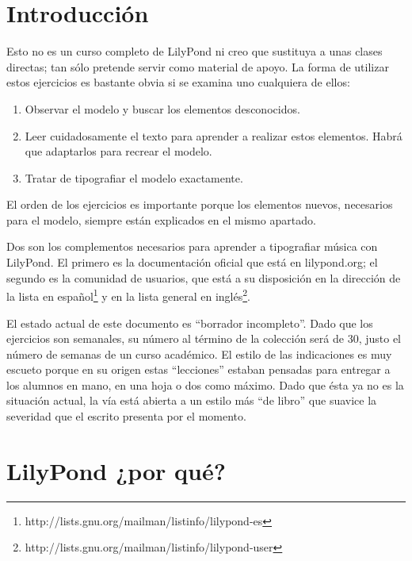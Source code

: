 \section*{Introducción}

Esto no es un curso completo de LilyPond ni creo que sustituya a unas
clases directas; tan sólo pretende servir como material de apoyo. La
forma de utilizar estos ejercicios es bastante obvia si se examina uno
cualquiera de ellos:

\begin{enumerate}
\item Observar el modelo y buscar los elementos desconocidos.

\item Leer cuidadosamente el texto para aprender a realizar estos
  elementos.  Habrá que adaptarlos para recrear el modelo.

\item Tratar de tipografiar el modelo exactamente.

\end{enumerate}

El orden de los ejercicios es importante porque los elementos nuevos,
necesarios para el modelo, siempre están explicados en el mismo
apartado.

Dos son los complementos necesarios para aprender a tipografiar música
con LilyPond.  El primero es la documentación oficial que está en
lilypond.org; el segundo es la comunidad de usuarios, que está a su
disposición en la dirección de la lista en
español\footnote{http://lists.gnu.org/mailman/listinfo/lilypond-es} y
en la lista general en
inglés\footnote{http://lists.gnu.org/mailman/listinfo/lilypond-user}.

El estado actual de este documento es ``borrador incompleto''.  Dado
que los ejercicios son semanales, su número al término de la colección
será de 30, justo el número de semanas de un curso académico.  El
estilo de las indicaciones es muy escueto porque en su origen estas
``lecciones'' estaban pensadas para entregar a los alumnos en mano, en
una hoja o dos como máximo.  Dado que ésta ya no es la situación
actual, la vía está abierta a un estilo más ``de libro'' que suavice
la severidad que el escrito presenta por el momento.

\section*{LilyPond ¿por qué?}

